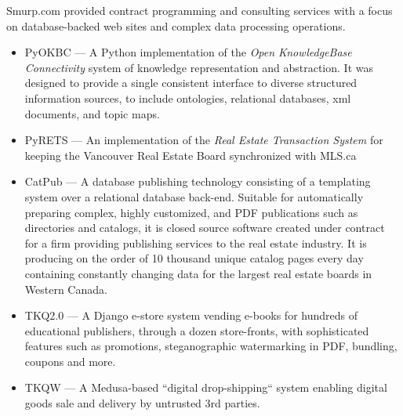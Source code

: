 \documentclass[line,margin,hidelinks]{res}
\begin{document}
\begin{resume}

\begin{position}
Smurp.com provided contract programming and consulting services with a focus
on database-backed web sites and complex data processing operations.

\begin{itemize}

  \item PyOKBC --- A Python implementation of the
     \emph{Open KnowledgeBase Connectivity}
  system of knowledge representation and abstraction.
  It was designed to provide a single consistent interface to diverse structured
  information sources, to include ontologies, relational databases,
  xml documents, and topic maps. %

  \item PyRETS --- An implementation of the \emph{Real Estate Transaction System}
  for keeping the Vancouver Real Estate Board synchronized with MLS.ca

  \item CatPub --- A database publishing technology consisting of a
  \PS templating system over a relational database back-end.
  Suitable for automatically preparing complex, highly customized,
  \PS and PDF publications such as directories and catalogs,
  it is closed source software created under contract for a firm
  providing publishing services to the real estate industry.
  It is producing on the order of 10 thousand unique catalog pages
  every day containing constantly changing data for the largest
  real estate boards in Western Canada.

  \item TKQ2.0 --- A Django e-store system vending e-books for hundreds
  of educational publishers, through a dozen store-fronts, with sophisticated
  features such as promotions, steganographic watermarking in PDF, bundling,
  coupons and more.

  \item TKQW --- A Medusa-based ``digital drop-shipping`` system
  enabling digital goods sale and delivery by untrusted 3rd parties.


\end{itemize}
\end{position}
\end{resume}
\end{document}

